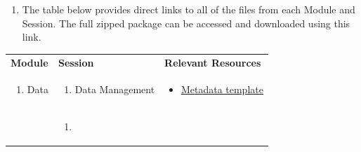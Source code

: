 \documentclass[
]{book}
\providecommand{\tightlist}{%
  \setlength{\itemsep}{0pt}\setlength{\parskip}{0pt}}
\begin{document}
\begin{enumerate}
\def\labelenumi{\arabic{enumi}.}
\tightlist
\item
  The table below provides direct links to all of the files from each Module and Session. The full zipped package can be accessed and downloaded using this link.
\end{enumerate}

\begin{longtable}[]{@{}lll@{}}
\toprule
\endhead
\begin{minipage}[t]{0.15\columnwidth}\raggedright
\textbf{Module}\strut
\end{minipage} & \begin{minipage}[t]{0.34\columnwidth}\raggedright
\textbf{Session}\strut
\end{minipage} & \begin{minipage}[t]{0.42\columnwidth}\raggedright
\textbf{Relevant Resources}\strut
\end{minipage}\tabularnewline
\begin{minipage}[t]{0.15\columnwidth}\raggedright
\begin{enumerate}
\def\labelenumi{\arabic{enumi}.}
\setcounter{enumi}{1}
\tightlist
\item
  Data
\end{enumerate}\strut
\end{minipage} & \begin{minipage}[t]{0.34\columnwidth}\raggedright
\begin{enumerate}
\def\labelenumi{\arabic{enumi}.}
\tightlist
\item
  Data Management
\end{enumerate}\strut
\end{minipage} & \begin{minipage}[t]{0.42\columnwidth}\raggedright
\begin{itemize}
\tightlist
\item
  \href{files/metadata_template_blank.xlsx}{Metadata template}
\end{itemize}\strut
\end{minipage}\tabularnewline
\begin{minipage}[t]{0.15\columnwidth}\raggedright
\strut
\end{minipage} & \begin{minipage}[t]{0.34\columnwidth}\raggedright
\begin{enumerate}
\def\labelenumi{\arabic{enumi}.}
\setcounter{enumi}{1}
\tightlist
\item

\end{enumerate}
\end{minipage}
\end{longtable}
\end{document}
